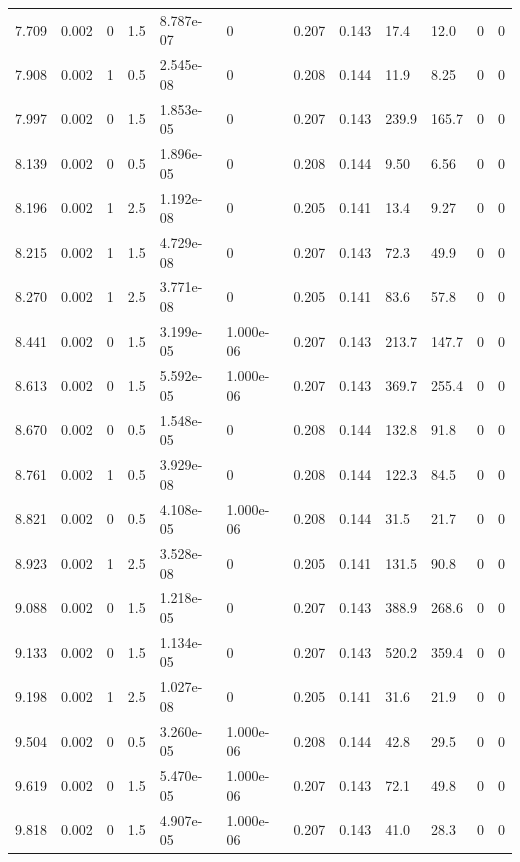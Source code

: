 \documentclass[preview]{standalone}
\begin{document}
{{{\begin{tabular}{L{1.2cm}C{1.2cm} C{0.3cm}C{0.5cm} C{1.4cm}C{1.4cm} C{1.4cm}C{1.4cm} C{1.6cm}C{1.6cm} C{1.6cm}C{1.6cm}}
  7.709  &  0.002  & 0     & 1.5 &  8.787e-07  & 0  &  0.207&   0.143& 17.4 & 12.0   &  0 & 0  \\ 
  7.908  &  0.002  & 1     & 0.5 &  2.545e-08  & 0  &  0.208&   0.144& 11.9 & 8.25   &  0 & 0  \\ 
  7.997  &  0.002  & 0     & 1.5 &  1.853e-05  & 0  &  0.207&   0.143& 239.9 & 165.7   &  0 & 0  \\ 
  8.139  &  0.002  & 0     & 0.5 &  1.896e-05  & 0  &  0.208&   0.144& 9.50 & 6.56   &  0 & 0  \\ 
  8.196  &  0.002  & 1     & 2.5 &  1.192e-08  & 0  &  0.205&   0.141& 13.4 & 9.27   &  0 & 0  \\ 
  8.215  &  0.002  & 1     & 1.5 &  4.729e-08  & 0  &  0.207&   0.143& 72.3 & 49.9   &  0 & 0  \\ 
  8.270  &  0.002  & 1     & 2.5 &  3.771e-08  & 0  &  0.205&   0.141& 83.6 & 57.8   &  0 & 0  \\ 
  8.441  &  0.002  & 0     & 1.5 &  3.199e-05  & 1.000e-06  &  0.207&   0.143& 213.7 & 147.7   &  0 & 0  \\ 
  8.613  &  0.002  & 0     & 1.5 &  5.592e-05  & 1.000e-06  &  0.207&   0.143& 369.7 & 255.4   &  0 & 0  \\ 
  8.670  &  0.002  & 0     & 0.5 &  1.548e-05  & 0  &  0.208&   0.144& 132.8 & 91.8   &  0 & 0  \\ 
  8.761  &  0.002  & 1     & 0.5 &  3.929e-08  & 0  &  0.208&   0.144& 122.3 & 84.5   &  0 & 0  \\ 
  8.821  &  0.002  & 0     & 0.5 &  4.108e-05  & 1.000e-06  &  0.208&   0.144& 31.5 & 21.7   &  0 & 0  \\ 
  8.923  &  0.002  & 1     & 2.5 &  3.528e-08  & 0  &  0.205&   0.141& 131.5 & 90.8   &  0 & 0  \\ 
  9.088  &  0.002  & 0     & 1.5 &  1.218e-05  & 0  &  0.207&   0.143& 388.9 & 268.6   &  0 & 0  \\ 
  9.133  &  0.002  & 0     & 1.5 &  1.134e-05  & 0  &  0.207&   0.143& 520.2 & 359.4   &  0 & 0  \\ 
  9.198  &  0.002  & 1     & 2.5 &  1.027e-08  & 0  &  0.205&   0.141& 31.6 & 21.9   &  0 & 0  \\ 
  9.504  &  0.002  & 0     & 0.5 &  3.260e-05  & 1.000e-06  &  0.208&   0.144& 42.8 & 29.5   &  0 & 0  \\ 
  9.619  &  0.002  & 0     & 1.5 &  5.470e-05  & 1.000e-06  &  0.207&   0.143& 72.1 & 49.8   &  0 & 0  \\ 
  9.818  &  0.002  & 0     & 1.5 &  4.907e-05  & 1.000e-06  &  0.207&   0.143& 41.0 & 28.3   &  0 & 0  \\ 

\end{tabular}}}}
\end{document}
